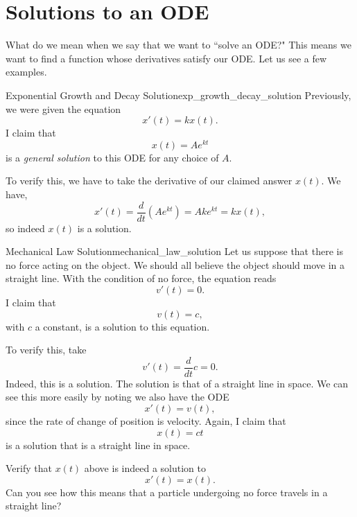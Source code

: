         \section{Solutions to an ODE}
        
        What do we mean when we say that we want to ``solve an ODE?" This means we want to find a function whose derivatives satisfy our ODE.  Let us see a few examples.
        
        \begin{ex}{Exponential Growth and Decay Solution}{exp_growth_decay_solution}
        Previously, we were given the equation
        \[
        x'(t)=kx(t).
        \]
        I claim that 
        \[
        x(t)=Ae^{kt}
        \]
        is a \emph{general solution} to this ODE for any choice of $A$. 
        
        To verify this, we have to take the derivative of our claimed answer $x(t)$. We have,
        \[
        x'(t)=\frac{d}{dt}\left(Ae^{kt}\right)=Ake^{kt}=kx(t),
        \]
        so indeed $x(t)$ is a solution.
        \end{ex}
        
        \begin{ex}{Mechanical Law Solution}{mechanical_law_solution}
        Let us suppose that there is no force acting on the object.  We should all believe the object should move in a straight line.  With the condition of no force, the equation reads
        \[
        v'(t)=0.
        \]
        I claim that 
        \[
        v(t)=c,
        \]
        with $c$ a constant, is a solution to this equation. 
        
        To verify this, take
        \[
        v'(t)=\frac{d}{dt} c = 0.
        \]
        Indeed, this is a solution.  The solution is that of a straight line in space.  We can see this more easily by noting we also have the ODE
        \[
        x'(t) = v(t),
        \]
        since the rate of change of position is velocity. Again, I claim that
        \[
        x(t) = ct
        \]
        is a solution that is a straight line in space. 
        \end{ex}
        
        \begin{exercise}
        Verify that $x(t)$ above is indeed a solution to 
        \[
        x'(t)=x(t).
        \]
        Can you see how this means that a particle undergoing no force travels in a straight line?
        \end{exercise}


